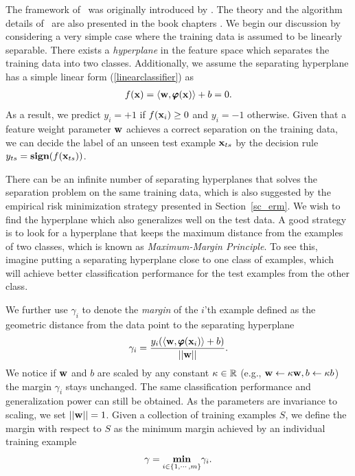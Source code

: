 {The framework of \svm\ was originally introduced by \citet{Cortes95support}.
The theory and the algorithm details of \svm\ are also presented in the book chapters \citep{Scholkopf02learning,taylor04,Bishop07}.
We begin our discussion by considering a very simple case where the training data is assumed to be linearly separable.
There exists a \textit{hyperplane} in the feature space which separates the training data into two classes.
Additionally, we assume the {separating hyperplane} has a simple linear form (\ref{linearclassifier}) as
\begin{align*}
	f(\mathbf {x})=\langle \mathbf {w}, \pmb \varphi(\mathbf {x}) \rangle + b = 0.
\end{align*}
As a result, we predict $y_i=+1$ if $f(\mathbf {x}_i)\ge0$ and $y_i=-1$ otherwise.
Given that a feature weight parameter $\mathbf {w}$ achieves a correct separation on the training data, we can decide the label of an unseen test example $\mathbf {x}_{ts}$ by the decision rule $y_{ts}=\textbf{sign}(f(\mathbf {x}_{ts}))$.

There can be an infinite number of separating hyperplanes that solves the separation problem on the same training data, which is also suggested by the empirical risk minimization strategy presented in Section~\ref{sc_erm}. 
We wish to find the hyperplane which also generalizes well on the test data.
A good strategy is to look for a hyperplane that keeps the maximum distance from the examples of two classes, which is known as \textit{Maximum-Margin Principle}.
To see this, imagine putting a separating hyperplane close to one class of examples, which will achieve better classification performance for the test examples from the other class.

We further use $\gamma_i$ to denote the \textit{margin} of the $i$'th example defined as the geometric distance from the data point to the separating hyperplane
\begin{align*}
	\gamma_i = \frac{y_i(\langle \mathbf {w}, \pmb \varphi(\mathbf {x}_i) \rangle+b)}{\left|\left| \mathbf {w} \right|\right|}.
\end{align*}
We notice if $\mathbf {w}$ and $b$ are scaled by any constant $\kappa\in\mathbb{R}$ (e.g., $\mathbf {w}\leftarrow\kappa\mathbf {w}, b\leftarrow\kappa b$) the margin $\gamma_i$ stays unchanged. 
The same classification performance and generalization power can still be obtained.
As the parameters are invariance to scaling, we set $\left|\left| \mathbf {w} \right|\right|=1$.
Given a collection of training examples $S$, we define the margin with respect to $S$ as the minimum margin achieved by an individual training example
\begin{align*}
	\gamma = \underset{i\in\{1,\cdots,m\}}{\textbf{min}}\gamma_i.
\end{align*}

}
